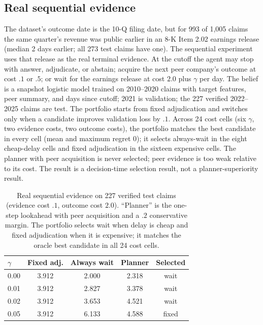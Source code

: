 \documentclass[11pt]{article}
\begin{document}
\subsection{Real sequential evidence}
\label{app:sequential}
The dataset's outcome date is the 10-Q filing date, but for 993 of 1,005
claims the same quarter's revenue was public earlier in an 8-K Item 2.02
earnings release (median 2 days earlier; all 273 test claims have one). The
sequential experiment uses that release as the real terminal evidence. At the
cutoff the agent may stop with answer, adjudicate, or abstain; acquire the next
peer company's outcome at cost $.1$ or $.5$; or wait for the earnings release
at cost $2.0$ plus $\gamma$ per day. The belief is a snapshot logistic model
trained on 2010--2020 claims with target features, peer summary, and days since
cutoff; 2021 is validation; the 227 verified 2022--2025 claims are test. The
portfolio starts from fixed adjudication and switches only when a candidate
improves validation loss by $.1$. Across 24 cost cells (six $\gamma$, two
evidence costs, two outcome costs), the portfolio matches the best candidate in
every cell (mean and maximum regret 0); it selects always-wait in the eight
cheap-delay cells and fixed adjudication in the sixteen expensive cells. The
planner with peer acquisition is never selected; peer evidence is too weak
relative to its cost. The result is a decision-time selection result, not a
planner-superiority result.

\begin{table}[t]
\centering
\small
\setlength{\tabcolsep}{3pt}
\begin{tabular}{lcccc}
\toprule
$\gamma$ & Fixed adj. & Always wait & Planner & Selected \\
\midrule
0.00 & 3.912 & 2.000 & 2.318 & wait \\
0.01 & 3.912 & 2.827 & 3.378 & wait \\
0.02 & 3.912 & 3.653 & 4.521 & wait \\
0.05 & 3.912 & 6.133 & 4.588 & fixed \\
\bottomrule
\end{tabular}
\caption{Real sequential evidence on 227 verified test claims (evidence cost
$.1$, outcome cost $2.0$). ``Planner'' is the one-step lookahead with peer
acquisition and a $.2$ conservative margin. The portfolio selects wait when
delay is cheap and fixed adjudication when it is expensive; it matches the
oracle best candidate in all 24 cost cells.}
\label{tab:sequential}
\end{table}
\end{document}
